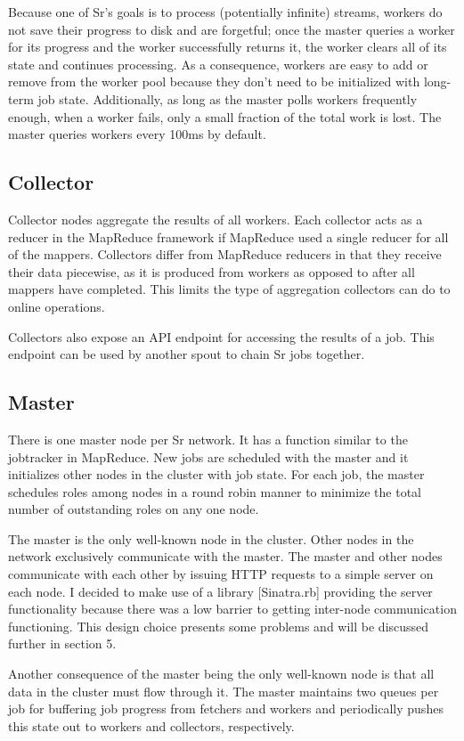\documentclass[12pt]{article}
\begin{document}
Because one of Sr’s goals is to process (potentially infinite) streams, workers do not save their progress to disk and are forgetful; once the master queries a worker for its progress and the worker successfully returns it, the worker clears all of its state and continues processing. As a consequence, workers are easy to add or remove from the worker pool because they don’t need to be initialized with long-term job state. Additionally, as long as the master polls workers frequently enough, when a worker fails, only a small fraction of the total work is lost. The master queries workers every 100ms by default.
\subsection{Collector}
Collector nodes aggregate the results of all workers. Each collector acts as a reducer in the MapReduce framework if MapReduce used a single reducer for all of the mappers. Collectors differ from MapReduce reducers in that they receive their data piecewise, as it is produced from workers as opposed to after all mappers have completed. This limits the type of aggregation collectors can do to online operations.

Collectors also expose an API endpoint for accessing the results of a job. This endpoint can be used by another spout to chain Sr jobs together.
\subsection{Master}
There is one master node per Sr network. It has a function similar to the jobtracker in MapReduce. New jobs are scheduled with the master and it initializes other nodes in the cluster with job state. For each job, the master schedules roles among nodes in a round robin manner to minimize the total number of outstanding roles on any one node.

The master is the only well-known node in the cluster. Other nodes in the network exclusively communicate with the master. The master and other nodes communicate with each other by issuing HTTP requests to a simple server on each node. I decided to make use of a library [Sinatra.rb] providing the server functionality because there was a low barrier to getting inter-node communication functioning. This design choice presents some problems and will be discussed further in section 5.

Another consequence of the master being the only well-known node is that all data in the cluster must flow through it. The master maintains two queues per job for buffering job progress from fetchers and workers and periodically pushes this state out to workers and collectors, respectively.
\end{document}
